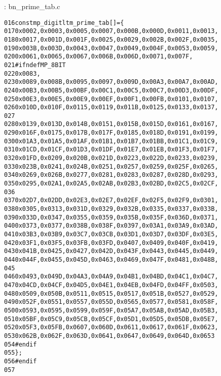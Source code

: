 \documentclass[b5paper]{book}
\begin{document}
\vspace{+3mm}\begin{small}
\hspace{-5.1mm}{\bf File}: bn\_prime\_tab.c
\vspace{-3mm}
\begin{alltt}
016   const mp_digit ltm_prime_tab[] = \{
017     0x0002, 0x0003, 0x0005, 0x0007, 0x000B, 0x000D, 0x0011, 0x0013,
018     0x0017, 0x001D, 0x001F, 0x0025, 0x0029, 0x002B, 0x002F, 0x0035,
019     0x003B, 0x003D, 0x0043, 0x0047, 0x0049, 0x004F, 0x0053, 0x0059,
020     0x0061, 0x0065, 0x0067, 0x006B, 0x006D, 0x0071, 0x007F,
021   #ifndef MP_8BIT
022     0x0083,
023     0x0089, 0x008B, 0x0095, 0x0097, 0x009D, 0x00A3, 0x00A7, 0x00AD,
024     0x00B3, 0x00B5, 0x00BF, 0x00C1, 0x00C5, 0x00C7, 0x00D3, 0x00DF,
025     0x00E3, 0x00E5, 0x00E9, 0x00EF, 0x00F1, 0x00FB, 0x0101, 0x0107,
026     0x010D, 0x010F, 0x0115, 0x0119, 0x011B, 0x0125, 0x0133, 0x0137,
027   
028     0x0139, 0x013D, 0x014B, 0x0151, 0x015B, 0x015D, 0x0161, 0x0167,
029     0x016F, 0x0175, 0x017B, 0x017F, 0x0185, 0x018D, 0x0191, 0x0199,
030     0x01A3, 0x01A5, 0x01AF, 0x01B1, 0x01B7, 0x01BB, 0x01C1, 0x01C9,
031     0x01CD, 0x01CF, 0x01D3, 0x01DF, 0x01E7, 0x01EB, 0x01F3, 0x01F7,
032     0x01FD, 0x0209, 0x020B, 0x021D, 0x0223, 0x022D, 0x0233, 0x0239,
033     0x023B, 0x0241, 0x024B, 0x0251, 0x0257, 0x0259, 0x025F, 0x0265,
034     0x0269, 0x026B, 0x0277, 0x0281, 0x0283, 0x0287, 0x028D, 0x0293,
035     0x0295, 0x02A1, 0x02A5, 0x02AB, 0x02B3, 0x02BD, 0x02C5, 0x02CF,
036   
037     0x02D7, 0x02DD, 0x02E3, 0x02E7, 0x02EF, 0x02F5, 0x02F9, 0x0301,
038     0x0305, 0x0313, 0x031D, 0x0329, 0x032B, 0x0335, 0x0337, 0x033B,
039     0x033D, 0x0347, 0x0355, 0x0359, 0x035B, 0x035F, 0x036D, 0x0371,
040     0x0373, 0x0377, 0x038B, 0x038F, 0x0397, 0x03A1, 0x03A9, 0x03AD,
041     0x03B3, 0x03B9, 0x03C7, 0x03CB, 0x03D1, 0x03D7, 0x03DF, 0x03E5,
042     0x03F1, 0x03F5, 0x03FB, 0x03FD, 0x0407, 0x0409, 0x040F, 0x0419,
043     0x041B, 0x0425, 0x0427, 0x042D, 0x043F, 0x0443, 0x0445, 0x0449,
044     0x044F, 0x0455, 0x045D, 0x0463, 0x0469, 0x047F, 0x0481, 0x048B,
045   
046     0x0493, 0x049D, 0x04A3, 0x04A9, 0x04B1, 0x04BD, 0x04C1, 0x04C7,
047     0x04CD, 0x04CF, 0x04D5, 0x04E1, 0x04EB, 0x04FD, 0x04FF, 0x0503,
048     0x0509, 0x050B, 0x0511, 0x0515, 0x0517, 0x051B, 0x0527, 0x0529,
049     0x052F, 0x0551, 0x0557, 0x055D, 0x0565, 0x0577, 0x0581, 0x058F,
050     0x0593, 0x0595, 0x0599, 0x059F, 0x05A7, 0x05AB, 0x05AD, 0x05B3,
051     0x05BF, 0x05C9, 0x05CB, 0x05CF, 0x05D1, 0x05D5, 0x05DB, 0x05E7,
052     0x05F3, 0x05FB, 0x0607, 0x060D, 0x0611, 0x0617, 0x061F, 0x0623,
053     0x062B, 0x062F, 0x063D, 0x0641, 0x0647, 0x0649, 0x064D, 0x0653
054   #endif
055   \};
056   #endif
057   
\end{alltt}
\end{small}
\end{document}
